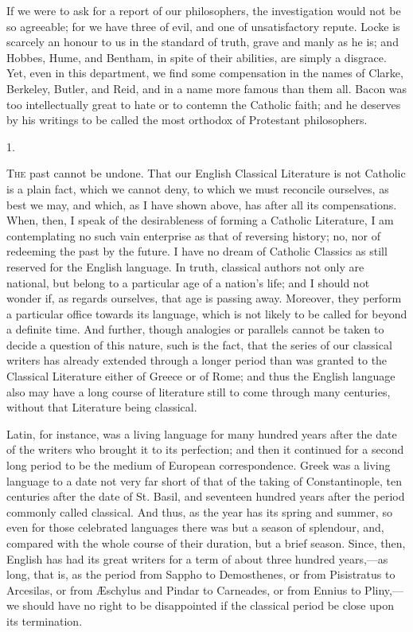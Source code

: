 If we were to ask for a report of our philosophers, the
investigation would not be so agreeable; for we have three of evil,
and one of unsatisfactory repute. Locke is scarcely an honour to us in
the standard of truth, grave and manly as he is; and Hobbes, Hume, and
Bentham, in spite of their abilities, are simply a disgrace. Yet, even
in this department, we find some compensation in the names of Clarke,
Berkeley, Butler, and Reid, and in a name more famous than them all.
Bacon was too intellectually great to hate or to contemn the Catholic
faith; and he deserves by his writings to be called the most orthodox
of Protestant philosophers.


1.

T\textsc{he} past cannot be undone. That our English Classical Literature is
not Catholic is a plain fact, which we cannot deny, to which we must
reconcile ourselves, as best we may, and which, as I have shown above,
has after all its compensations. When, then, I speak of the
desirableness of forming a Catholic Literature, I am contemplating no
such vain enterprise as that of reversing history; no, nor of
redeeming the past by the future. I have no dream of Catholic Classics
as still reserved for the English language. In truth, classical
authors not only are national, but belong to a particular age of a
nation's life; and I should not wonder if, as regards ourselves, that
age is passing away. Moreover, they perform a particular office
towards its language, which is not likely to be called for beyond a
definite time. And further, though analogies or parallels cannot be
taken to decide a question of this nature, such is the fact, that the
series of our classical writers has already extended through a longer
period than was granted to the Classical Literature either of Greece
or of Rome; and thus the English language also may have a long course
of literature still to come through many centuries, without that
Literature being classical.

Latin, for instance, was a living language for many hundred years
after the date of the writers who brought it to its perfection; and
then it continued for a second long period to be the medium of
European correspondence. Greek was a living language to a date not
very far short of that of the taking of Constantinople, ten centuries
after the date of St. Basil, and seventeen hundred years after the
period commonly called classical. And thus, as the year has its spring
and summer, so even for those celebrated languages there was but a
season of splendour, and, compared with the whole course of their
duration, but a brief season. Since, then, English has had its great
writers for a term of about three hundred years,—as long, that is,
as the period from Sappho to Demosthenes, or from Pisistratus to
Arcesilas, or from Æschylus and Pindar to Carneades, or from Ennius
to Pliny,—we should have no right to be disappointed if the
classical period be close upon its termination.

